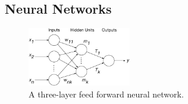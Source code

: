 %
%
%
%
%












\subsection{Neural Networks}


\begin{figure}
	\centering
	\includegraphics[width=0.4\textwidth]{Chapter5/figures/market-forecasting/methods/Kell_eEnergy_Fig1.eps}
	\caption{A three-layer feed forward neural network.}
	\label{fig:mlp}
\end{figure}

